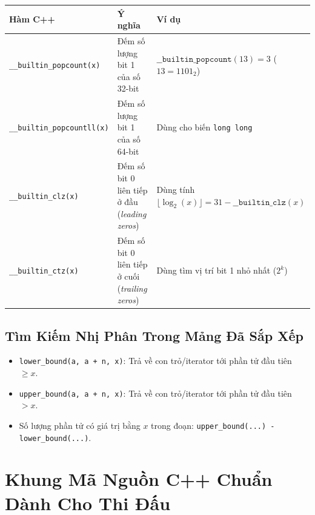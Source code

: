 \documentclass[11pt,a4paper]{article}
\begin{document}
\begin{table}[h!]
\centering
\begin{tabular}{@{}lll@{}}
\toprule
\textbf{Hàm C++} & \textbf{Ý nghĩa} & \textbf{Ví dụ} \\ \midrule
\texttt{\_\_builtin\_popcount(x)} & Đếm số lượng bit 1 của số 32-bit & $\texttt{\_\_builtin\_popcount}(13) = 3$ ($13 = 1101_2$) \\
\texttt{\_\_builtin\_popcountll(x)} & Đếm số lượng bit 1 của số 64-bit & Dùng cho biến \texttt{long long} \\
\texttt{\_\_builtin\_clz(x)} & Đếm số bit 0 liên tiếp ở đầu (\textit{leading zeros}) & Dùng tính $\lfloor \log_2(x) \rfloor = 31 - \texttt{\_\_builtin\_clz}(x)$ \\
\texttt{\_\_builtin\_ctz(x)} & Đếm số bit 0 liên tiếp ở cuối (\textit{trailing zeros}) & Dùng tìm vị trí bit 1 nhỏ nhất ($2^k$) \\ \bottomrule
\end{tabular}
\end{table}

\subsection{Tìm Kiếm Nhị Phân Trong Mảng Đã Sắp Xếp}
\begin{itemize}
    \item \texttt{lower\_bound(a, a + n, x)}: Trả về con trỏ/iterator tới phần tử đầu tiên $\ge x$.
    \item \texttt{upper\_bound(a, a + n, x)}: Trả về con trỏ/iterator tới phần tử đầu tiên $> x$.
    \item Số lượng phần tử có giá trị bằng $x$ trong đoạn: \texttt{upper\_bound(...) - lower\_bound(...)}.
\end{itemize}

\vspace{15pt}
\section{Khung Mã Nguồn C++ Chuẩn Dành Cho Thi Đấu}
\end{document}
